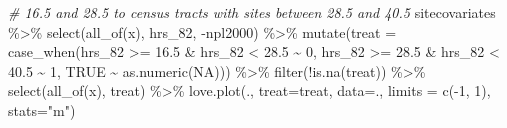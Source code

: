 \documentclass[
]{article}
\newenvironment{Shaded}{\begin{snugshade}}{\end{snugshade}}
\newcommand{\AttributeTok}[1]{\textcolor[rgb]{0.77,0.63,0.00}{#1}}
\newcommand{\CommentTok}[1]{\textcolor[rgb]{0.56,0.35,0.01}{\textit{#1}}}
\newcommand{\ConstantTok}[1]{\textcolor[rgb]{0.00,0.00,0.00}{#1}}
\newcommand{\DecValTok}[1]{\textcolor[rgb]{0.00,0.00,0.81}{#1}}
\newcommand{\FloatTok}[1]{\textcolor[rgb]{0.00,0.00,0.81}{#1}}
\newcommand{\FunctionTok}[1]{\textcolor[rgb]{0.00,0.00,0.00}{#1}}
\newcommand{\NormalTok}[1]{#1}
\newcommand{\SpecialCharTok}[1]{\textcolor[rgb]{0.00,0.00,0.00}{#1}}
\newcommand{\StringTok}[1]{\textcolor[rgb]{0.31,0.60,0.02}{#1}}
\begin{document}
\begin{Shaded}
\begin{Highlighting}[]
\CommentTok{\# 16.5 and 28.5 to census tracts with sites between 28.5 and 40.5}
\NormalTok{sitecovariates }\SpecialCharTok{\%\textgreater{}\%}
    \FunctionTok{select}\NormalTok{(}\FunctionTok{all\_of}\NormalTok{(x), hrs\_82, }\SpecialCharTok{{-}}\NormalTok{npl2000) }\SpecialCharTok{\%\textgreater{}\%}
    \FunctionTok{mutate}\NormalTok{(}\AttributeTok{treat =} \FunctionTok{case\_when}\NormalTok{(hrs\_82 }\SpecialCharTok{\textgreater{}=} \FloatTok{16.5} \SpecialCharTok{\&}\NormalTok{ hrs\_82 }\SpecialCharTok{\textless{}} \FloatTok{28.5} \SpecialCharTok{\textasciitilde{}} \DecValTok{0}\NormalTok{,}
\NormalTok{                             hrs\_82 }\SpecialCharTok{\textgreater{}=} \FloatTok{28.5} \SpecialCharTok{\&}\NormalTok{ hrs\_82 }\SpecialCharTok{\textless{}} \FloatTok{40.5} \SpecialCharTok{\textasciitilde{}} \DecValTok{1}\NormalTok{,}
                             \ConstantTok{TRUE} \SpecialCharTok{\textasciitilde{}} \FunctionTok{as.numeric}\NormalTok{(}\ConstantTok{NA}\NormalTok{))) }\SpecialCharTok{\%\textgreater{}\%}
    \FunctionTok{filter}\NormalTok{(}\SpecialCharTok{!}\FunctionTok{is.na}\NormalTok{(treat)) }\SpecialCharTok{\%\textgreater{}\%}
    \FunctionTok{select}\NormalTok{(}\FunctionTok{all\_of}\NormalTok{(x), treat) }\SpecialCharTok{\%\textgreater{}\%}
    \FunctionTok{love.plot}\NormalTok{(., }\AttributeTok{treat=}\StringTok{\textquotesingle{}treat\textquotesingle{}}\NormalTok{, }\AttributeTok{data=}\NormalTok{., }\AttributeTok{limits =} \FunctionTok{c}\NormalTok{(}\SpecialCharTok{{-}}\DecValTok{1}\NormalTok{, }\DecValTok{1}\NormalTok{),}
            \AttributeTok{stats=}\StringTok{"m"}\NormalTok{)}


\end{Highlighting}
\end{Shaded}
\end{document}
